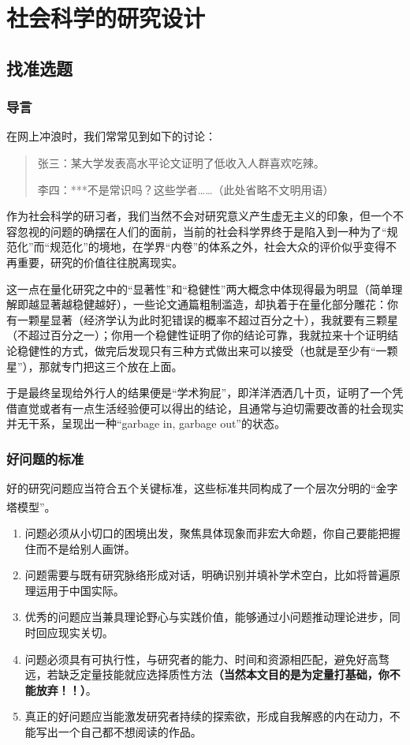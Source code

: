 \chapter{社会科学的研究设计}

\section{找准选题}

\subsection{导言}

在网上冲浪时，我们常常见到如下的讨论：

\begin{quote}
	{\fangsong 张三：某大学发表高水平论文证明了低收入人群喜欢吃辣。
	
	李四：***不是常识吗？这些学者\ldots\ldots（此处省略不文明用语）
	}
\end{quote}

作为社会科学的研习者，我们当然不会对研究意义产生虚无主义的印象，但一个不容忽视的问题的确摆在人们的面前，当前的社会科学界终于是陷入到一种为了``规范化''而``规范化''的境地，在学界``内卷''的体系之外，社会大众的评价似乎变得不再重要，研究的价值往往脱离现实。

这一点在量化研究之中的``显著性''和``稳健性''两大概念中体现得最为明显（简单理解即越显著越稳健越好），一些论文通篇粗制滥造，却执着于在量化部分雕花：你有一颗星显著（经济学认为此时犯错误的概率不超过百分之十），我就要有三颗星（不超过百分之一）；你用一个稳健性证明了你的结论可靠，我就拉来十个证明结论稳健性的方式，做完后发现只有三种方式做出来可以接受（也就是至少有``一颗星''），那就专门把这三个放在上面。

于是最终呈现给外行人的结果便是``学术狗屁''，即洋洋洒洒几十页，证明了一个凭借直觉或者有一点生活经验便可以得出的结论，且通常与迫切需要改善的社会现实并无干系，呈现出一种``garbage
in, garbage out''的状态。

\subsection{好问题的标准}

好的研究问题应当符合五个关键标准，这些标准共同构成了一个层次分明的``金字塔模型''\textsuperscript{\cite{1}}。

\begin{enumerate}
	\item
	问题必须从小切口的困境出发，聚焦具体现象而非宏大命题，你自己要能把握住而不是给别人画饼。
	\item
	问题需要与既有研究脉络形成对话，明确识别并填补学术空白，比如将普遍原理运用于中国实际。
	\item
	优秀的问题应当兼具理论野心与实践价值，能够通过小问题推动理论进步，同时回应现实关切。
	\item
	问题必须具有可执行性，与研究者的能力、时间和资源相匹配，避免好高骛远，若缺乏定量技能就应选择质性方法\textbf{（当然本文目的是为定量打基础，你不能放弃！！）}。
	\item
	真正的好问题应当能激发研究者持续的探索欲，形成自我解惑的内在动力，不能写出一个自己都不想阅读的作品。
\end{enumerate}

